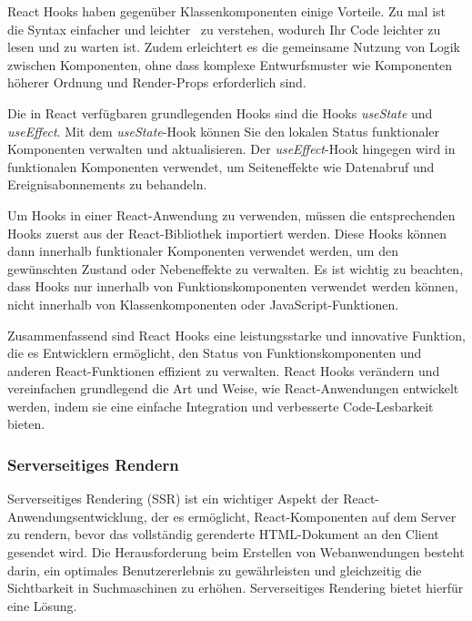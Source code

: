 React Hooks haben gegenüber Klassenkomponenten einige Vorteile. Zu mal ist die Syntax einfacher und leichter  zu verstehen, wodurch Ihr Code leichter zu lesen und zu warten ist. Zudem erleichtert es die gemeinsame Nutzung von Logik zwischen Komponenten, ohne dass komplexe Entwurfsmuster wie Komponenten höherer Ordnung und Render-Props erforderlich sind.

Die in React verfügbaren grundlegenden Hooks sind die Hooks \emph{useState} und \emph{useEffect}. Mit dem \emph{useState}-Hook können Sie den lokalen Status funktionaler Komponenten verwalten und aktualisieren. Der \emph{useEffect}-Hook hingegen wird in funktionalen Komponenten verwendet, um Seiteneffekte wie Datenabruf und Ereignisabonnements zu behandeln.

Um Hooks in einer React-Anwendung zu verwenden, müssen die entsprechenden Hooks zuerst aus der React-Bibliothek importiert werden. Diese Hooks können dann innerhalb funktionaler Komponenten verwendet werden, um den gewünschten Zustand oder Nebeneffekte zu verwalten. Es ist wichtig zu beachten, dass Hooks nur innerhalb von Funktionskomponenten verwendet werden können, nicht innerhalb von Klassenkomponenten oder JavaScript-Funktionen. \cite{react-hooks}

Zusammenfassend sind React Hooks eine leistungsstarke und innovative Funktion, die es Entwicklern ermöglicht, den Status von Funktionskomponenten und anderen React-Funktionen effizient zu verwalten. React Hooks verändern und vereinfachen grundlegend die Art und Weise, wie React-Anwendungen entwickelt werden, indem sie eine einfache Integration und verbesserte Code-Lesbarkeit bieten.

\subsubsection{Serverseitiges Rendern}
Serverseitiges Rendering (SSR) ist ein wichtiger Aspekt der React-Anwendungsentwicklung, der es ermöglicht, React-Komponenten auf dem Server zu rendern, bevor das vollständig gerenderte HTML-Dokument an den Client gesendet wird.
Die Herausforderung beim Erstellen von Webanwendungen besteht darin, ein optimales Benutzererlebnis zu gewährleisten und gleichzeitig die Sichtbarkeit in Suchmaschinen zu erhöhen. Serverseitiges Rendering bietet hierfür eine Lösung.

